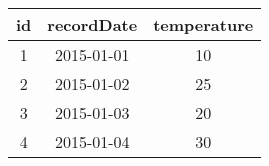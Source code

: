 \begin{tabular}{|c|c|c|}
    \hline
        \textbf{id} & \textbf{recordDate} & \textbf{temperature} \\ \hline
        1 & 2015-01-01 & 10 \\ 
        2 & 2015-01-02 & 25 \\ 
        3 & 2015-01-03 & 20 \\ 
        4 & 2015-01-04 & 30 \\ \hline
\end{tabular}
    